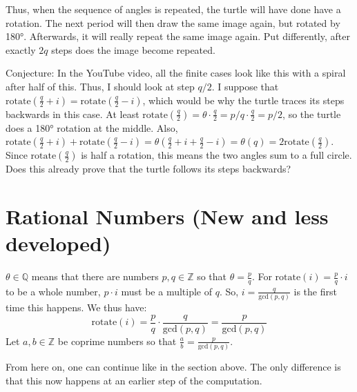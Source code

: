 \documentclass[pdftex,a4paper]{scrartcl}
\newcommand{\rotate}{\text{rotate}}
\begin{document}
Thus, when the sequence of angles is repeated, the turtle will have done have a rotation. The next period will then draw
the same image again, but rotated by 180°. Afterwards, it will really repeat the same image again. Put differently,
after exactly \(2q\) steps does the image become repeated.

Conjecture: In the YouTube video, all the finite cases look like this with a spiral after half of this. Thus, I should
look at step \(q/2\). I suppose that \(\rotate(\frac{q}{2} + i)=\rotate(\frac{q}{2} -i)\), which would be why the turtle
traces its steps backwards in this case. At least \(\rotate(\frac{q}{2})=\theta\cdot \frac{q}{2} = p/q \cdot \frac{q}{2}
= p/2\), so the turtle does a 180° rotation at the middle. Also, \(\rotate(\frac{q}{2} + i)+\rotate(\frac{q}{2}-i) =
\theta(\frac{q}{2}+i + \frac{q}{2}-i) = \theta(q) = 2\rotate(\frac{q}{2})\).  Since \(\rotate(\frac{q}{2})\) is half a
rotation, this means the two angles sum to a full circle. Does this already prove that the turtle follows its steps
backwards?

\section{Rational Numbers (New and less developed)}
\(\theta\in\mathbb{Q}\) means that there are numbers \(p,q\in\mathbb{Z}\) so that \(\theta=\frac{p}{q}\).
For \(\rotate(i)=\frac{p}{q}\cdot i\) to be a whole number, \(p\cdot i\) must be a multiple of \(q\). So,
\(i=\frac{q}{\text{gcd}(p,q)}\) is the first time this happens. We thus have:
\[
\rotate(i)=\frac{p}{q}\cdot\frac{q}{\text{gcd}(p,q)}=\frac{p}{\text{gcd}(p,q)}
\]
Let \(a,b\in\mathbb{Z}\) be coprime numbers so that \(\frac{a}{b}=\frac{p}{\text{gcd}(p,q)}\).

From here on, one can continue like in the section above. The only difference is that this now happens at an earlier step
of the computation.
\end{document}
